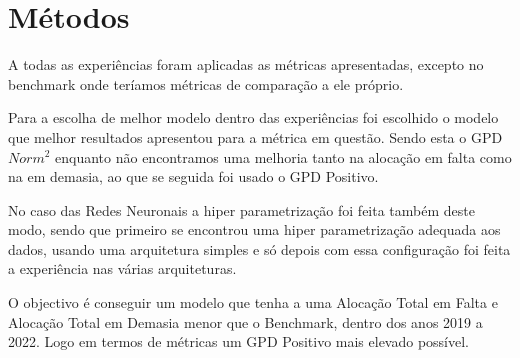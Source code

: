\chapter{Métodos}

A todas as experiências foram aplicadas as métricas apresentadas, excepto no benchmark onde teríamos métricas de comparação a ele próprio.\par
Para a escolha de melhor modelo dentro das experiências foi escolhido o modelo que melhor resultados apresentou para a métrica em questão. Sendo esta o GPD $Norm^{2}$ enquanto não encontramos uma melhoria tanto na alocação em falta como na em demasia, ao que se seguida foi usado o GPD Positivo.\par
No caso das Redes Neuronais a hiper parametrização foi feita também deste modo, sendo que primeiro se encontrou uma hiper parametrização adequada aos dados, usando uma arquitetura simples e só depois com essa configuração foi feita a experiência  nas várias arquiteturas.\par
O objectivo é conseguir um modelo que tenha a uma Alocação Total em Falta e Alocação Total em Demasia menor que o Benchmark, dentro dos anos 2019 a 2022. Logo em termos de métricas um GPD Positivo mais elevado possível.\par

\thispagestyle{plain}
 \label{se:metstats}


\newpage
\thispagestyle{plain}
 \label{se:metneuralnet}

\thispagestyle{plain}


